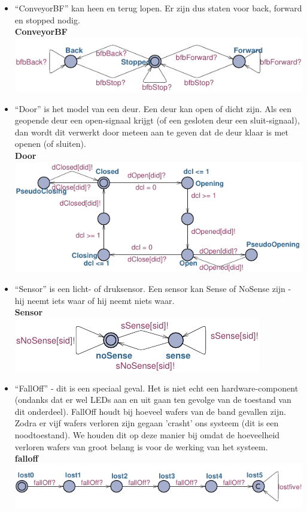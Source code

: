 \begin{itemize}
    \item ``ConveyorBF'' kan heen en terug lopen. Er zijn dus staten voor back, forward en stopped nodig.\\
    \textbf{ConveyorBF} \\
    \includegraphics{UPconveyorBF} \\
    \item ``Door'' is het model van een deur. Een deur kan open of dicht zijn. Als een geopende deur een open-signaal krijgt (of een gesloten deur een sluit-signaal), dan wordt dit verwerkt door meteen aan te geven dat de deur klaar is met openen (of sluiten).\\
    
    \textbf{Door} \\
    \includegraphics{UPdoor} \\
    \item ``Sensor'' is een licht- of druksensor. Een sensor kan Sense of NoSense zijn - hij neemt iets waar of hij neemt niets waar.\\
    \textbf{Sensor} \\
    \includegraphics{UPsensor} \\
    \item ``FallOff'' - dit is een speciaal geval. Het is niet echt een hardware-component (ondanks dat er wel LEDs aan en uit gaan ten gevolge van de toestand van dit onderdeel). FallOff houdt bij hoeveel wafers van de band gevallen zijn. Zodra er vijf wafers verloren zijn gegaan 'crasht' ons systeem (dit is een noodtoestand). We houden dit op deze manier bij omdat de hoeveelheid verloren wafers van groot belang is voor de werking van het systeem.\\
    \textbf{falloff} \\
    \includegraphics{UPfalloff} \\
\end{itemize} \\

